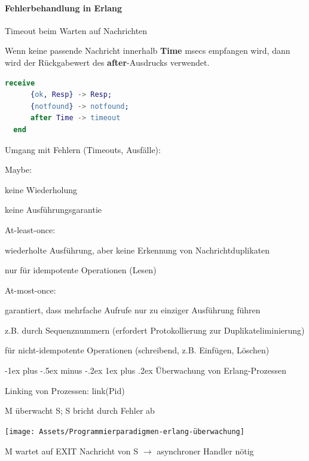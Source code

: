 \documentclass[10pt]{article}
\makeatletter
\renewcommand{\subsubsection}{\@startsection{subsubsection}{3}{0mm}%
                                {-1ex plus -.5ex minus -.2ex}%
                                {1ex plus .2ex}%
                                {\normalfont\small\bfseries}}
\makeatother
\begin{document}
  \paragraph{Fehlerbehandlung in Erlang}
  
  \begin{itemize*}
    \item Timeout beim Warten auf Nachrichten
    \item Wenn keine passende Nachricht innerhalb \textbf{Time} msecs empfangen wird, dann wird der Rückgabewert des \textbf{after}-Ausdrucks verwendet.
  \end{itemize*}
  \begin{lstlisting}[language=erlang]
  receive
      {ok, Resp} -> Resp;
      {notfound} -> notfound;
      after Time -> timeout
  end
  \end{lstlisting}
  
  Umgang mit Fehlern (Timeouts, Ausfälle):
  \begin{itemize*}
    \item Maybe:
    \begin{itemize*}
      \item keine Wiederholung
      \item keine Ausführungsgarantie
    \end{itemize*}
    \item At-least-once:
    \begin{itemize*}
      \item wiederholte Ausführung, aber keine Erkennung von Nachrichtduplikaten
      \item nur für idempotente Operationen (Lesen)
    \end{itemize*}
    \item At-most-once:
    \begin{itemize*}
      \item garantiert, dass mehrfache Aufrufe nur zu einziger Ausführung führen
      \item z.B. durch Sequenznummern (erfordert Protokollierung zur Duplikateliminierung)
      \item für nicht-idempotente Operationen (schreibend, z.B. Einfügen, Löschen)
    \end{itemize*}
  \end{itemize*}
  
  \subsubsection{Überwachung von Erlang-Prozessen}
  \begin{itemize*}
    \item Linking von Prozessen: \color{green}link\color{blue}(Pid) \color{black}
    \item M überwacht S; S bricht durch Fehler ab
    \begin{center}
      \centering
      \texttt{[image: Assets/Programmierparadigmen-erlang-überwachung]}
    \end{center}
    \item M wartet auf EXIT Nachricht von S $\rightarrow$ asynchroner Handler nötig
  \end{itemize*}
  
\end{document}
